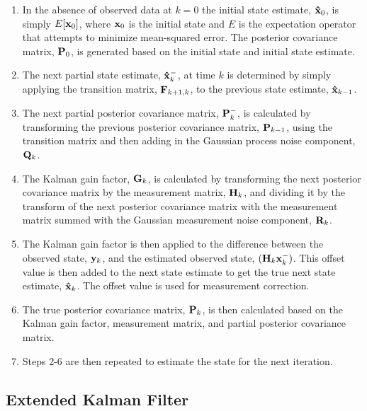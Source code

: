 \documentclass[11pt]{article}
\begin{document}
\begin{enumerate}

\item{In the absence of observed data at $k = 0$ the initial state estimate, ${\bf \hat x}_0$, is simply $E[{\bf x}_0]$, where ${\bf x}_0$ is the initial state and $E$ is the expectation operator that attempts to minimize mean-squared error. The posterior covariance matrix, ${\bf P}_0$, is generated based on the initial state and initial state estimate.}

\item{The next partial state estimate, ${\bf \hat x}^-_k$, at time $k$ is determined by simply applying the transition matrix, ${\bf F}_{k+1,k}$, to the previous state estimate, ${\bf \hat x}_{k-1}$.}

\item{The next partial posterior covariance matrix, ${\bf P}^-_k$, is calculated by transforming the previous posterior covariance matrix, ${\bf P}_{k-1}$, using the transition matrix and then adding in the Gaussian process noise component, ${\bf Q}_k$.}

\item{The Kalman gain factor, ${\bf G}_k$, is calculated by transforming the next posterior covariance matrix by the measurement matrix, ${\bf H}_k$, and dividing it by the transform of the next posterior covariance matrix with the measurement matrix summed with the Gaussian measurement noise component, ${\bf R}_k$.}

\item{The Kalman gain factor is then applied to the difference between the observed state, ${\bf y}_k$, and the estimated observed state, $({\bf H}_k {\bf x}^-_k)$. This offset value is then added to the next state estimate to get the true next state estimate, ${\bf \hat x}_k$. The offset value is used for measurement correction.}

\item{The true posterior covariance matrix, ${\bf P}_k$, is then calculated based on the Kalman gain factor, measurement matrix, and partial posterior covariance matrix.}

\item{Steps 2-6 are then repeated to estimate the state for the next iteration.}

\end{enumerate}



\subsection{Extended Kalman Filter}
\end{document}
